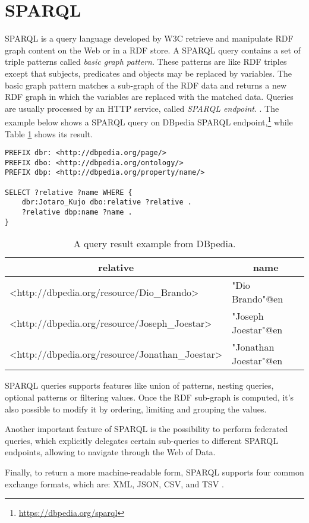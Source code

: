\section{SPARQL}
\label{sec:sparql}

\ac{SPARQL} is a query language developed by \ac{W3C} retrieve and manipulate \ac{RDF} graph content on the Web or in a \ac{RDF} store. A \ac{SPARQL} query contains a set of triple patterns called \textit{basic graph pattern}. These patterns are like \ac{RDF} triples except that subjects, predicates and objects may be replaced by variables. The basic graph pattern matches a sub-graph of the \ac{RDF} data and returns a new \ac{RDF} graph in which the variables are replaced with the matched data. Queries are usually processed by an \ac{HTTP} service, called \textit{\ac{SPARQL} endpoint}. \cite{world2013sparql}. The example below shows a \ac{SPARQL} query on DBpedia \ac{SPARQL} endpoint,\footnote{\url{https://dbpedia.org/sparql}} while Table \ref{tab:sparql-example} shows its result.

\begin{verbatim}
PREFIX dbr: <http://dbpedia.org/page/>
PREFIX dbo: <http://dbpedia.org/ontology/>
PREFIX dbp: <http://dbpedia.org/property/name/>

SELECT ?relative ?name WHERE {
    dbr:Jotaro_Kujo dbo:relative ?relative .
    ?relative dbp:name ?name .
}
\end{verbatim}

\begin{table}[!ht]
    \centering
    \begin{tabular}{|l|l|}
        \hline
        \multicolumn{1}{|c|}{\textbf{relative}} & \multicolumn{1}{c|}{\textbf{name}} \\ \hline
        <http://dbpedia.org/resource/Dio\_Brando> & "Dio Brando"@en \\ \hline
        <http://dbpedia.org/resource/Joseph\_Joestar> & "Joseph Joestar"@en \\ \hline
        <http://dbpedia.org/resource/Jonathan\_Joestar> & "Jonathan Joestar"@en \\ \hline
    \end{tabular}
    \caption{A query result example from DBpedia.}
    \label{tab:sparql-example}
\end{table}

\ac{SPARQL} queries supports features like union of patterns, nesting queries, optional patterns or filtering values. Once the \ac{RDF} sub-graph is computed, it's also possible to modify it by ordering, limiting and grouping the values.

Another important feature of \ac{SPARQL} is the possibility to perform federated queries, which explicitly delegates certain sub-queries to different \ac{SPARQL} endpoints, allowing to navigate through the Web of Data.

Finally, to return a more machine-readable form, \ac{SPARQL} supports four common exchange formats, which are: \ac{XML}, \ac{JSON}, \ac{CSV}, and \ac{TSV} \cite{world2013sparql}.
